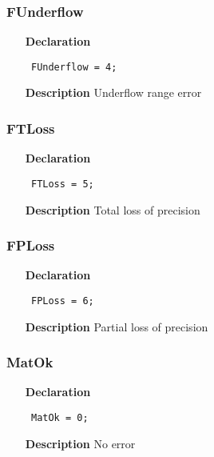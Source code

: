\documentclass[12pt,a4paper,oneside]{report}
\newcommand{\declarationitem}[1]{\textbf{#1}}
\newcommand{\descriptiontitle}[1]{\textbf{#1}}
\newcommand{\code}[1]{\texttt{#1}}
\begin{document}
\subsubsection{FUnderflow}
\label{uErrors-FUnderflow}
\begin{itemize}\item[\declarationitem{Declaration}\hfill]
	\begin{flushleft}
		\code{
			FUnderflow = 4;}
		
	\end{flushleft}
	
	\par
	\item[\descriptiontitle{Description}]
	Underflow range error
	
\end{itemize}
\subsubsection{FTLoss}
\label{uErrors-FTLoss}
\begin{itemize}\item[\declarationitem{Declaration}\hfill]
	\begin{flushleft}
		\code{
			FTLoss     = 5;}
		
	\end{flushleft}
	
	\par
	\item[\descriptiontitle{Description}]
	Total loss of precision
	
\end{itemize}
\subsubsection{FPLoss}
\label{uErrors-FPLoss}
\begin{itemize}\item[\declarationitem{Declaration}\hfill]
	\begin{flushleft}
		\code{
			FPLoss     = 6;}
		
	\end{flushleft}
	
	\par
	\item[\descriptiontitle{Description}]
	Partial loss of precision
	
\end{itemize}
\subsubsection{MatOk}
\label{uErrors-MatOk}
\begin{itemize}\item[\declarationitem{Declaration}\hfill]
	\begin{flushleft}
		\code{
			MatOk      = 0;}
		
	\end{flushleft}
	
	\par
	\item[\descriptiontitle{Description}]
	No error
	
\end{itemize}
\end{document}
